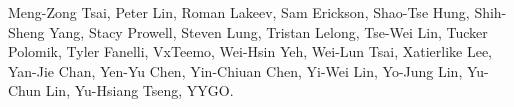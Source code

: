 Meng-Zong Tsai,                %
Peter Lin,                     %
Roman Lakeev,                  %
Sam Erickson,                  %
Shao-Tse Hung,                 %
Shih-Sheng Yang,               %
Stacy Prowell,                 %
Steven Lung,                   %
Tristan Lelong,                %
Tse-Wei Lin,                   %
Tucker Polomik,                %
Tyler Fanelli,                 %
VxTeemo,                       %
Wei-Hsin Yeh,                  %
Wei-Lun Tsai,                  %
Xatierlike Lee,                %
Yan-Jie Chan,                  %
Yen-Yu Chen,                   %
Yin-Chiuan Chen,               %
Yi-Wei Lin,                    %
Yo-Jung Lin,                   %
Yu-Chun Lin,                   %
Yu-Hsiang Tseng,               %
YYGO.                          %
